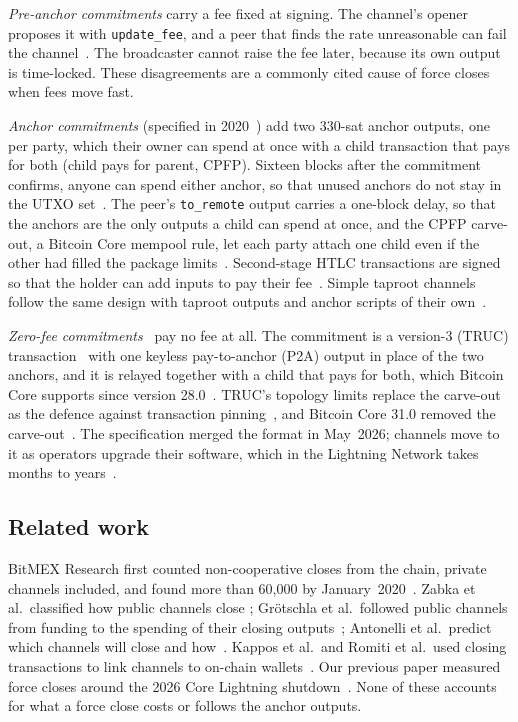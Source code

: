 \emph{Pre-anchor commitments} carry a fee fixed at signing. The channel's opener proposes it with
\texttt{update\_fee}, and a peer that finds the rate unreasonable can fail the channel~\cite{bolt2}. The broadcaster
cannot raise the fee later, because its own output is time-locked. These disagreements are a commonly cited cause of
force closes when fees move fast.

\emph{Anchor commitments} (specified in 2020~\cite{bolts688anchors}) add two 330-sat anchor outputs, one per party,
which their owner can spend at once with a child transaction that pays for both (child pays for parent, CPFP). Sixteen
blocks after the commitment confirms, anyone can spend either anchor, so that unused anchors do not stay in the UTXO
set~\cite{bolt3}. The peer's \texttt{to\_remote} output carries a one-block delay, so that the anchors are the only
outputs a child can spend at once, and the CPFP carve-out, a Bitcoin Core mempool rule, let each party attach one
child even if the other had filled the package limits~\cite{core31}. Second-stage HTLC transactions are signed so that
the holder can add inputs to pay their fee~\cite{bolt3}. Simple taproot channels follow the same design with taproot
outputs and anchor scripts of their own~\cite{bolts995taproot}.

\emph{Zero-fee commitments}~\cite{bolts1228zerofee} pay no fee at all. The commitment is a version-3 (TRUC)
transaction~\cite{bip431} with one keyless pay-to-anchor (P2A) output in place of the two anchors, and it is relayed
together with a child that pays for both, which Bitcoin Core supports since version 28.0~\cite{core28}. TRUC's topology limits replace
the carve-out as the defence against transaction pinning~\cite{optechpinning}, and Bitcoin Core 31.0 removed the
carve-out~\cite{core31}. The specification merged the format in May~2026; channels move to it as operators upgrade
their software, which in the Lightning Network takes months to years~\cite{kumar2026upgradedynamics}.

\subsection{Related work}
BitMEX Research first counted non-cooperative closes from the chain, private channels included, and found more than
60,000 by January~2020~\cite{bitmex2020closures}. Zabka et al.\ classified how public channels close
\cite{zabka2022empirical}; Grötschla et al.\ followed public channels from funding to the spending of their closing
outputs~\cite{grotschla2025lifecycle}; Antonelli et al.\ predict which channels will close and
how~\cite{antonelli2026closures}. Kappos et al.\ and Romiti et al.\ used closing transactions to link channels to
on-chain wallets~\cite{kappos2021empirical,romiti2021crosslayer}. Our previous paper measured force closes around
the 2026 Core Lightning shutdown~\cite{kumar2026clientdiversity}. None of these accounts for what a force close costs
or follows the anchor outputs.

